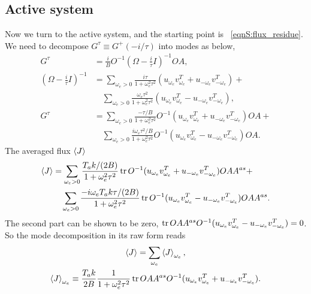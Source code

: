 \documentclass[
 amsmath,amssymb,
 aps,
 pre,
 longbibliography,
 10pt, onecolumn,
 notitlepage
]{revtex4-1}
\begin{document}
\subsection{Active system}
Now we turn to the active system, and the starting point is \eqnname~\eqref{eqnS:flux_residue}. 
We need to decompose $G^\tau \equiv G^+(-i/\tau)$ into modes as below,
\begin{align}
G^\tau &= \frac{i}{B} O^{-1} (\Omega - \frac{i}{\tau}I)^{-1} OA ,\\
(\Omega - \frac{i}{\tau}I)^{-1} &=
\sum_{\omega_e > 0}\frac{i\tau}{1 + \omega_e^2 \tau^2}  (u_{\omega_e} v_{\omega_e}^T + u_{-\omega_e} v_{-\omega_e}^T) + \\
&\quad \sum_{\omega_e > 0}\frac{\omega_e\tau^2}{1 + \omega_e^2 \tau^2}  (u_{\omega_e} v_{\omega_e}^T - u_{-\omega_e} v_{-\omega_e}^T) ,\\
G^\tau &= \sum_{\omega_e > 0}\frac{-\tau/B}{1 + \omega_e^2 \tau^2} O^{-1} (u_{\omega_e} v_{\omega_e}^T + u_{-\omega_e} v_{-\omega_e}^T) OA + \\
&\quad \sum_{\omega_e > 0}\frac{i\omega_e\tau^2/B}{1 + \omega_e^2 \tau^2} O^{-1} (u_{\omega_e} v_{\omega_e}^T - u_{-\omega_e} v_{-\omega_e}^T) OA .
\end{align}
The averaged flux $\expval{J}$
\begin{equation}
\begin{split}
\expval{J} &=
\sum_{\omega_e > 0}\frac{T_ak/(2B)}{1 + \omega_e^2 \tau^2} \tr O^{-1} (u_{\omega_e} v_{\omega_e}^T + u_{-\omega_e} v_{-\omega_e}^T) OAA^{as} + \\
&\quad \sum_{\omega_e > 0}\frac{-i\omega_e T_ak\tau/(2B)}{1 + \omega_e^2 \tau^2} \tr O^{-1} (u_{\omega_e} v_{\omega_e}^T - u_{-\omega_e} v_{-\omega_e}^T) OAA^{as}.
\end{split}
\end{equation}
The second part can be shown to be zero,
$\tr OAA^{as}O^{-1} (u_{\omega_e} v_{\omega_e}^T - u_{-\omega_e} v_{-\omega_e}^T) = 0$.
So the mode decomposition in its raw form reads
\begin{gather}
\expval{J} = \sum_{\omega_e} \expval{J}_{\omega_e} ,\\
\expval{J}_{\omega_e} \equiv \frac{T_ak}{2B}\frac{1}{1 + \omega_e^2 \tau^2} \tr OAA^{as}O^{-1} (u_{\omega_e} v_{\omega_e}^T + u_{-\omega_e} v_{-\omega_e}^T). \label{eqnS:mode_J_active}
\end{gather}
\end{document}
